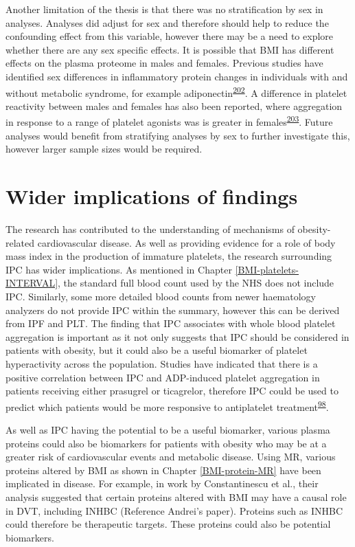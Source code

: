 \documentclass[11pt,twoside]{bristolthesis}
\begin{document}
Another limitation of the thesis is that there was no stratification by sex in analyses. Analyses did adjust for sex and therefore should help to reduce the confounding effect from this variable, however there may be a need to explore whether there are any sex specific effects. It is possible that BMI has different effects on the plasma proteome in males and females. Previous studies have identified sex differences in inflammatory protein changes in individuals with and without metabolic syndrome, for example adiponectin\textsuperscript{\protect\hyperlink{ref-TerHorst2020}{202}}. A difference in platelet reactivity between males and females has also been reported, where aggregation in response to a range of platelet agonists was is greater in females\textsuperscript{\protect\hyperlink{ref-Becker2006}{203}}. Future analyses would benefit from stratifying analyses by sex to further investigate this, however larger sample sizes would be required.

\hypertarget{wider-implications-of-findings}{%
\section{Wider implications of findings}\label{wider-implications-of-findings}}

The research has contributed to the understanding of mechanisms of obesity-related cardiovascular disease. As well as providing evidence for a role of body mass index in the production of immature platelets, the research surrounding IPC has wider implications. As mentioned in Chapter \ref{BMI-platelets-INTERVAL}, the standard full blood count used by the NHS does not include IPC. Similarly, some more detailed blood counts from newer haematology analyzers do not provide IPC within the summary, however this can be derived from IPF and PLT. The finding that IPC associates with whole blood platelet aggregation is important as it not only suggests that IPC should be considered in patients with obesity, but it could also be a useful biomarker of platelet hyperactivity across the population. Studies have indicated that there is a positive correlation between IPC and ADP-induced platelet aggregation in patients receiving either prasugrel or ticagrelor, therefore IPC could be used to predict which patients would be more responsive to antiplatelet treatment\textsuperscript{\protect\hyperlink{ref-Bernlochner2015a}{98}}.

As well as IPC having the potential to be a useful biomarker, various plasma proteins could also be biomarkers for patients with obesity who may be at a greater risk of cardiovascular events and metabolic disease. Using MR, various proteins altered by BMI as shown in Chapter \ref{BMI-protein-MR} have been implicated in disease. For example, in work by Constantinescu et al., their analysis suggested that certain proteins altered with BMI may have a causal role in DVT, including INHBC (Reference Andrei's paper). Proteins such as INHBC could therefore be therapeutic targets. These proteins could also be potential biomarkers.
\end{document}
